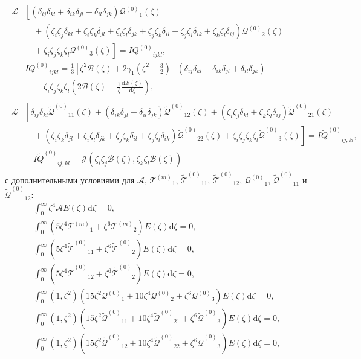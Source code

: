 \documentclass[a4paper,12pt]{article}
\newcommand{\dd}{\mathrm{d}}
\newcommand{\der}[2][]{\frac{\dd#1}{\dd#2}}
\newcommand{\Q}{\ensuremath{\mathcal{Q}^{(0)}}}
\newcommand{\T}[1]{\ensuremath{\mathcal{T}^{(#1)}}}
\newcommand{\TT}{\ensuremath{\tilde{\mathcal{T}}^{(0)}}}
\newcommand{\QQ}{\ensuremath{\tilde{\mathcal{Q}}^{(0)}}}
\newcommand{\IF}[2][0]{\ensuremath{I{#2}^{(#1)}}}
\newcommand{\IFF}[1]{\ensuremath{I\tilde{#1}^{(0)}}}
\newcommand{\ZZD}[3]{\zeta_{#1}\zeta_{#2}\delta_{#3}}
\newcommand{\ZZZZ}{\zeta_i\zeta_j\zeta_k\zeta_l}
\newcommand{\DD}[2]{\delta_{#1}\delta_{#2}}
\begin{document}
\begin{gather}
    \begin{aligned}
    \mathcal{L}&\left[(\DD{ij}{kl}+\DD{ik}{jl}+\DD{il}{jk}) \Q_1(\zeta) \right. \\
        &\quad + \left.(\ZZD{i}{j}{kl}+\ZZD{i}{k}{jl}+\ZZD{i}{l}{jk}+\ZZD{j}{k}{il}+\ZZD{j}{l}{ik}+\ZZD{k}{l}{ij}) \Q_2(\zeta)\right. \\
        &\quad + \left.\ZZZZ \Q_3(\zeta)\right] = \IF{Q}_{ijkl}, \\
        & \IF{Q}_{ijkl} = \frac13\left[\zeta^2\mathcal{B}(\zeta)+2\gamma_1\left(\zeta^2-\frac32\right)\right](\DD{ij}{kl}+\DD{ik}{jl}+\DD{il}{jk}) \\
        &\quad - \ZZZZ\left(2\mathcal{B}(\zeta) - \frac1\zeta\der[\mathcal{B}(\zeta)]{\zeta}\right),
    \end{aligned}\label{eq:Q}\\[6pt]
    \begin{aligned}
    \mathcal{L}&\left[\DD{ij}{kl}\QQ_{11}(\zeta) + (\DD{ik}{jl}+\DD{il}{jk})\QQ_{12}(\zeta) + (\ZZD{i}{j}{kl}+\ZZD{k}{l}{ij})\QQ_{21}(\zeta) \right. \\
        &\quad + \left.(\ZZD{i}{k}{jl}+\ZZD{i}{l}{jk}+\ZZD{j}{k}{il}+\ZZD{j}{l}{ik}) \QQ_{22}(\zeta) + \ZZZZ \QQ_3(\zeta)\right] = \IFF{Q}_{ij,kl}, \\
        &\quad \IFF{Q}_{ij,kl} = \mathcal{J}(\zeta_i\zeta_j\mathcal{B}(\zeta), \zeta_k\zeta_l\mathcal{B}(\zeta))
    \end{aligned}\label{eq:QQ}
\end{gather}
с дополнительными условиями для \(\mathcal{A}\), \(\T{m}_1\), \(\TT_{11}\), \(\TT_{12}\), \(\Q_1\), \(\QQ_{11}\) и \(\QQ_{12}\):
\begin{gather}
    \int_0^\infty \zeta^4 \mathcal{A} E(\zeta) \dd\zeta = 0, \label{eq:A_constraint}\\
    \int_0^\infty \left( 5\zeta^4\T{m}_1 + \zeta^6\T{m}_2 \right) E(\zeta) \dd\zeta = 0, \label{eq:Tm_constraint}\\
    \int_0^\infty \left( 5\zeta^4\TT_{11} + \zeta^6\TT_2 \right) E(\zeta) \dd\zeta = 0, \label{eq:T11_constraint}\\
    \int_0^\infty \left( 5\zeta^4\TT_{12} + \zeta^6\TT_2 \right) E(\zeta) \dd\zeta = 0, \label{eq:T12_constraint}\\
    \int_0^\infty (1,\zeta^2)\left( 15\zeta^2\Q_1 + 10\zeta^4\Q_2 + \zeta^6\Q_3 \right) E(\zeta) \dd\zeta = 0, \\
    \int_0^\infty (1,\zeta^2)\left( 15\zeta^2\QQ_{11} + 10\zeta^4\QQ_{21} + \zeta^6\QQ_3 \right) E(\zeta) \dd\zeta = 0, \\
    \int_0^\infty (1,\zeta^2)\left( 15\zeta^2\QQ_{12} + 10\zeta^4\QQ_{22} + \zeta^6\QQ_3 \right) E(\zeta) \dd\zeta = 0,
\end{gather}
\end{document}
